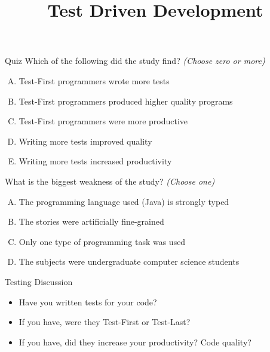 \documentclass{beamer}
\title{Test Driven Development}
\date{}
\begin{document}
\begin{frame}
\titlepage
\end{frame}

\begin{frame}{Quiz}
Which of the following did the study find? \hfill \textit{(Choose zero or more)}
\begin{enumerate}[(A)]
\item<1-2> Test-First programmers wrote more tests 
\item<1> Test-First programmers produced higher quality programs
\item<1> Test-First programmers were more productive
\item<1> Writing more tests improved quality
\item<1-2> Writing more tests increased productivity
\end{enumerate}
\medskip
What is the biggest weakness of the study? \hfill \textit{(Choose one)}
\begin{enumerate}[(A)]
\item<1> The programming language used (Java) is strongly typed
\item<1> The stories were artificially fine-grained
\item<1-2> Only one type of programming task was used
\item<1> The subjects were undergraduate computer science students
\end{enumerate}
\end{frame}

\begin{frame}{Testing Discussion}
\begin{itemize}[<+->]
\item Have you written tests for your code?
\item If you have, were they Test-First or Test-Last?
\item If you have, did they increase your productivity? Code quality?
\end{itemize}
\end{frame}
\end{document}
